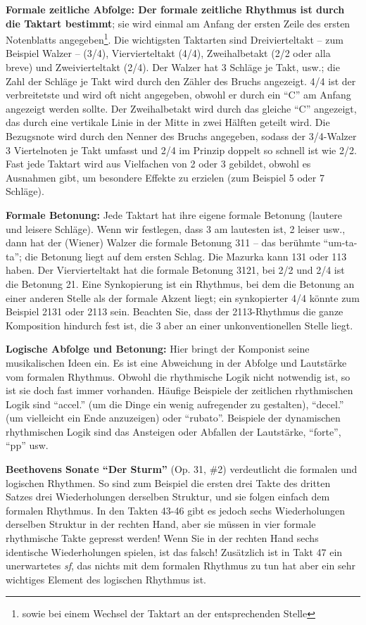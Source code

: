 \textbf{Formale zeitliche Abfolge:
Der formale zeitliche Rhythmus ist durch die Taktart bestimmt}; sie wird einmal am Anfang der ersten Zeile des ersten Notenblatts angegeben\footnote{sowie bei einem Wechsel der Taktart an der entsprechenden Stelle}.
Die wichtigsten Taktarten sind Dreivierteltakt -- zum Beispiel Walzer -- (3/4), Viervierteltakt (4/4), Zweihalbetakt (2/2 oder alla breve) und Zweivierteltakt (2/4).
Der Walzer hat 3 Schläge je Takt, usw.; die Zahl der Schläge je Takt wird durch den Zähler des Bruchs angezeigt. 
4/4 ist der verbreitetste und wird oft nicht angegeben, obwohl er durch ein \enquote{C} am Anfang angezeigt werden sollte.
Der Zweihalbetakt wird durch das gleiche \enquote{C} angezeigt, das durch eine vertikale Linie in der Mitte in zwei Hälften geteilt wird.
Die Bezugsnote wird durch den Nenner des Bruchs angegeben, sodass der 3/4-Walzer 3 Viertelnoten je Takt umfasst und 2/4 im Prinzip doppelt so schnell ist wie 2/2.
Fast jede Taktart wird aus Vielfachen von 2 oder 3 gebildet, obwohl es Ausnahmen gibt, um besondere Effekte zu erzielen (zum Beispiel 5 oder 7 Schläge).

\textbf{Formale Betonung:}
Jede Taktart hat ihre eigene formale Betonung (lautere und leisere Schläge).
Wenn wir festlegen, dass 3 am lautesten ist, 2 leiser usw., dann hat der (Wiener) Walzer die formale Betonung 311 -- das berühmte \enquote{um-ta-ta}; die Betonung liegt auf dem ersten Schlag.
Die Mazurka kann 131 oder 113 haben. 
Der Viervierteltakt hat die formale Betonung 3121, bei 2/2 und 2/4 ist die Betonung 21.
Eine Synkopierung ist ein Rhythmus, bei dem die Betonung an einer anderen Stelle als der formale Akzent liegt; ein synkopierter 4/4 könnte zum Beispiel 2131 oder 2113 sein.
Beachten Sie, dass der 2113-Rhythmus die ganze Komposition hindurch fest ist, die 3 aber an einer unkonventionellen Stelle liegt.

\textbf{Logische Abfolge und Betonung:}
Hier bringt der Komponist seine musikalischen Ideen ein.
Es ist eine Abweichung in der Abfolge und Lautstärke vom formalen Rhythmus.
Obwohl die rhythmische Logik nicht notwendig ist, so ist sie doch fast immer vorhanden.
Häufige Beispiele der zeitlichen rhythmischen Logik sind \enquote{accel.} (um die Dinge ein wenig aufregender zu gestalten), \enquote{decel.} (um vielleicht ein Ende anzuzeigen) oder \enquote{rubato}.
Beispiele der dynamischen rhythmischen Logik sind das Ansteigen oder Abfallen der Lautstärke, \enquote{forte}, \enquote{pp} usw.

\textbf{Beethovens Sonate \enquote{Der Sturm}} (Op. 31, \#2) verdeutlicht die formalen und logischen Rhythmen.
So sind zum Beispiel die ersten drei Takte des dritten Satzes drei Wiederholungen derselben Struktur, und sie folgen einfach dem formalen Rhythmus.
In den Takten 43-46 gibt es jedoch sechs Wiederholungen derselben Struktur in der rechten Hand, aber sie müssen in vier formale rhythmische Takte gepresst werden!
Wenn Sie in der rechten Hand sechs identische Wiederholungen spielen, ist das falsch!
Zusätzlich ist in Takt 47 ein unerwartetes \textit{sf}, das nichts mit dem formalen Rhythmus zu tun hat aber ein sehr wichtiges Element des logischen Rhythmus ist.

